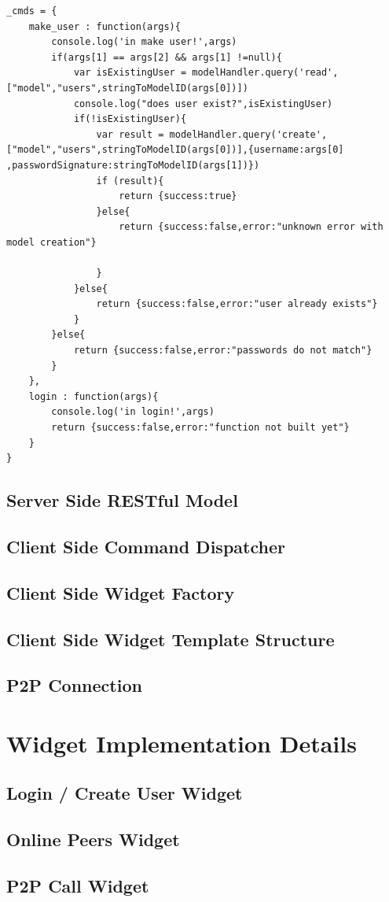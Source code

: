 \documentclass[a4paper,12pt]{report}
\begin{document}
\begin{lstlisting}
_cmds = {
	make_user : function(args){
		console.log('in make user!',args)
		if(args[1] == args[2] && args[1] !=null){
			var isExistingUser = modelHandler.query('read',["model","users",stringToModelID(args[0])])
			console.log("does user exist?",isExistingUser)
			if(!isExistingUser){
				var result = modelHandler.query('create',["model","users",stringToModelID(args[0])],{username:args[0] ,passwordSignature:stringToModelID(args[1])})
				if (result){
					return {success:true}
				}else{
					return {success:false,error:"unknown error with model creation"}

				}
			}else{
				return {success:false,error:"user already exists"}
			}
		}else{
			return {success:false,error:"passwords do not match"}
		}
	},
	login : function(args){
		console.log('in login!',args)
		return {success:false,error:"function not built yet"}
	}
}

\end{lstlisting}

\section{Server Side RESTful Model}
\section{Client Side Command Dispatcher}
\section{Client Side Widget Factory}
\section{Client Side Widget Template Structure}
\section{P2P Connection}

\chapter{Widget Implementation Details}
\section{Login / Create User Widget}
\section{Online Peers Widget}
\section{P2P Call Widget}


\end{document}
